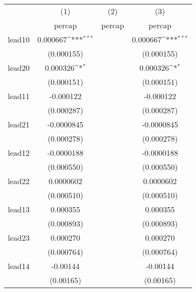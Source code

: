 {
\def\sym#1{\ifmmode^{#1}\else\(^{#1}\)\fi}
\begin{tabular}{l*{3}{c}}
\hline\hline
            &\multicolumn{1}{c}{(1)}&\multicolumn{1}{c}{(2)}&\multicolumn{1}{c}{(3)}\\
            &\multicolumn{1}{c}{percap}&\multicolumn{1}{c}{percap}&\multicolumn{1}{c}{percap}\\
\hline
lead10      &    0.000667\sym{***}&                     &    0.000667\sym{***}\\
            &  (0.000155)         &                     &  (0.000155)         \\
[1em]
lead20      &    0.000326\sym{*}  &                     &    0.000326\sym{*}  \\
            &  (0.000151)         &                     &  (0.000151)         \\
[1em]
lead11      &   -0.000122         &                     &   -0.000122         \\
            &  (0.000287)         &                     &  (0.000287)         \\
[1em]
lead21      &  -0.0000845         &                     &  -0.0000845         \\
            &  (0.000278)         &                     &  (0.000278)         \\
[1em]
lead12      &  -0.0000188         &                     &  -0.0000188         \\
            &  (0.000550)         &                     &  (0.000550)         \\
[1em]
lead22      &   0.0000602         &                     &   0.0000602         \\
            &  (0.000510)         &                     &  (0.000510)         \\
[1em]
lead13      &    0.000355         &                     &    0.000355         \\
            &  (0.000893)         &                     &  (0.000893)         \\
[1em]
lead23      &    0.000270         &                     &    0.000270         \\
            &  (0.000764)         &                     &  (0.000764)         \\
[1em]
lead14      &    -0.00144         &                     &    -0.00144         \\
            &   (0.00165)         &                     &   (0.00165)         \\

\end{tabular}}
